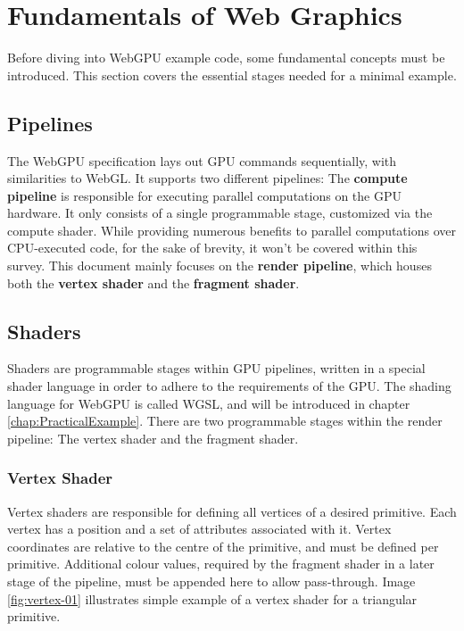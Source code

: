 %
%
%
%

\chapter{Fundamentals of Web Graphics}

\label{chap:Fundamentals}

Before diving into WebGPU example code, some fundamental concepts must
be introduced. This section covers the essential stages needed for a
minimal example.

\section{Pipelines}
The WebGPU specification lays out GPU commands sequentially, with
similarities to WebGL. It supports two different pipelines: The
\textbf{compute pipeline} is responsible for executing parallel
computations on the GPU hardware. It only consists of a single
programmable stage, customized via the compute shader. While providing
numerous benefits to parallel computations over CPU-executed code, for
the sake of brevity, it won't be covered within this survey. This
document mainly focuses on the \textbf{render pipeline}, which houses
both the \textbf{vertex shader} and the \textbf{fragment shader}.

\section{Shaders}
Shaders are programmable stages within GPU pipelines, written in a
special shader language in order to adhere to the requirements of the
GPU. The shading language for WebGPU is called WGSL, and will be
introduced in chapter \ref{chap:PracticalExample}. There are two
programmable stages within the render pipeline: The vertex shader and
the fragment shader.

\subsection{Vertex Shader}
Vertex shaders are responsible for defining all vertices of a desired
primitive. Each vertex has a position and a set of attributes associated
with it. Vertex coordinates are relative to the centre of the primitive,
and must be defined per primitive. Additional colour values, required by
the fragment shader in a later stage of the pipeline, must be appended
here to allow pass-through. Image \ref{fig:vertex-01} illustrates simple
example of a vertex shader for a triangular primitive.

